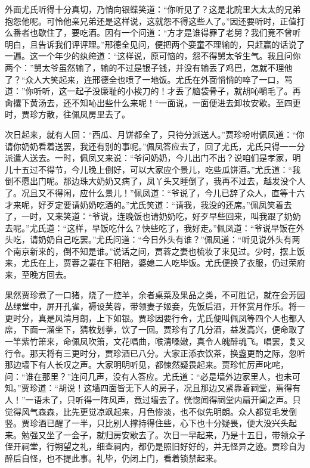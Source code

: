 \documentclass[12pt,oneside]{book}
\begin{document}
外面尤氏听得十分真切，乃悄向银蝶笑道：“你听见了？这是北院里大太太的兄弟抱怨他呢。可怜他亲兄弟还是这样说，这就怨不得这些人了。”因还要听时，正值打么番者也歇住了，要吃酒。因有一个问道：“方才是谁得罪了老舅？我们竟不曾听明白，且告诉我们评评理。”邢德全见问，便把两个娈童不理输的，只赶赢的话说了一遍。这一个年少的纨绔道：“这样说，原可恼的，怨不得舅太爷生气。我且问你两个：”舅太爷虽然输了，输的不过是银子钱，并没有输丢了鸡巴，怎就不理他了？“众人大笑起来，连邢德全也喷了一地饭。尤氏在外面悄悄的啐了一口，骂道：”你听听，这一起子没廉耻的小挨刀的！才丢了脑袋骨子，就胡吣嚼毛了。再肏攮下黄汤去，还不知吣出些什么来呢！“一面说，一面便进去卸妆安歇。至四更时，贾珍方散，往佩凤房里去了。

次日起来，就有人回：“西瓜、月饼都全了，只待分派送人。”贾珍吩咐佩凤道：“你请你奶奶看着送罢，我还有别的事呢。”佩凤答应去了，回了尤氏，尤氏只得一一分派遣人送去。一时，佩凤又来说：“爷问奶奶，今儿出门不出？说咱们是孝家，明儿十五过不得节，今儿晚上倒好，可以大家应个景儿，吃些瓜饼酒。”尤氏道：“我倒不愿出门呢。那边珠大奶奶又病了，凤丫头又睡倒了，我再不过去，越发没个人了。况且又不得闲，应什么景儿！”佩凤道：“爷说了，今儿已辞了众人，直等十六才来呢，好歹定要请奶奶吃酒的。”尤氏笑道：“请我，我没的还席。”佩凤笑着去了，一时，又来笑道：“爷说，连晚饭也请奶奶吃，好歹早些回来，叫我跟了奶奶去呢。”尤氏道：“这样，早饭吃什么？快些吃了，我好走。”佩凤道：“爷说早饭在外头吃，请奶奶自己吃罢。”尤氏问道：“今日外头有谁？”佩凤道：“听见说外头有两个南京新来的，倒不知是谁。”说话之间，贾蓉之妻也梳妆了来见过。少时，摆上饭来，尤氏在上，贾蓉之妻在下相陪，婆媳二人吃毕饭。尤氏便换了衣服，仍过荣府来，至晚方回去。

果然贾珍煮了一口猪，烧了一腔羊，余者桌菜及果品之类，不可胜记，就在会芳园丛绿堂中，屏开孔雀，褥设芙蓉，带领妻子姬妾，先饭后酒，开怀赏月作乐。将一更时分，真是风清月朗，上下如银。贾珍因要行令，尤氏便叫佩凤等四个人也都入席，下面一溜坐下，猜枚划拳，饮了一回。贾珍有了几分酒，益发高兴，便命取了一竿紫竹箫来，命佩凤吹箫，文花唱曲，喉清嗓嫩，真令人魄醉魂飞。唱罢，复又行令。那天将有三更时分，贾珍酒已八分。大家正添衣饮茶，换盏更酌之际，忽听那边墙下有人长叹之声。大家明明听见，都悚然疑畏起来。贾珍忙厉声叱咤，问：“谁在那里？”连问几声，没有人答应。尤氏道：“必是墙外边家里人，也未可知。”贾珍道：“胡说！这墙四面皆无下人的房子，况且那边又紧靠着祠堂，焉得有人！”一语未了，只听得一阵风声，竟过墙去了。恍惚闻得祠堂内扇开阖之声。只觉得风气森森，比先更觉凉飒起来，月色惨淡，也不似先明朗。众人都觉毛发倒竖。贾珍酒已醒了一半，只比别人撑持得住些，心下也十分疑畏，便大没兴头起来。勉强又坐了一会子，就归房安歇去了。次日一早起来，乃是十五日，带领众子侄开祠堂，行朔望之礼，细查祠内，都仍是照旧好好的，并无怪异之迹。贾珍自为醉后自怪，也不提此事。礼毕，仍闭上门，看着锁禁起来。
\end{document}
